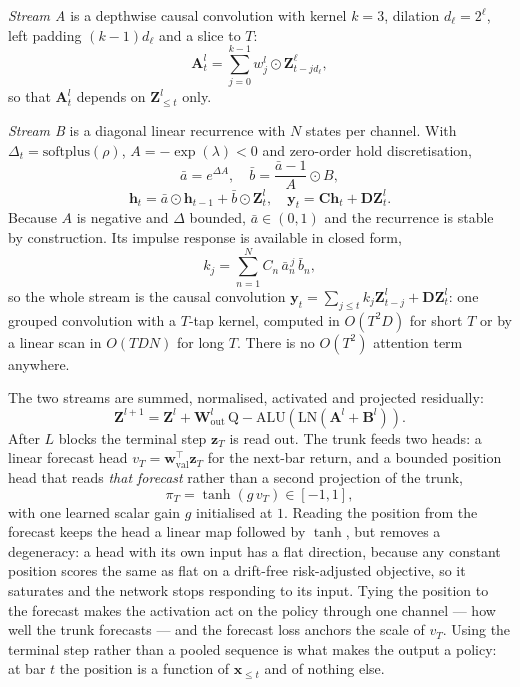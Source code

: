 \documentclass[conference]{IEEEtran}
\newcommand{\QALU}{\mathrm{Q-ALU}}
\begin{document}
\emph{Stream A} is a depthwise causal convolution with kernel $k=3$, dilation
$d_{\ell}=2^{\ell}$, left padding $(k-1)d_{\ell}$ and a slice to $T$:
\begin{equation}
\mathbf{A}^{l}_t=\sum_{j=0}^{k-1} w^{l}_{j}\odot \mathbf{Z}^{\ell}_{t-jd_{\ell}},
\end{equation}
so that $\mathbf{A}^l_t$ depends on $\mathbf{Z}^l_{\le t}$ only.

\emph{Stream B} is a diagonal linear recurrence with $N$ states per channel.
With $\Delta_t=\mathrm{softplus}(\rho)$, $A=-\exp(\lambda)<0$ and zero-order
hold discretisation,
\begin{equation}
\bar{a}=e^{\Delta A},\quad \bar{b}=\frac{\bar a-1}{A}\odot B ,
\end{equation}
\begin{equation}
\mathbf{h}_t=\bar a\odot\mathbf{h}_{t-1}+\bar b\odot\mathbf{Z}^l_t,\quad
\mathbf{y}_t=\mathbf{C}\mathbf{h}_t+\mathbf{D}\mathbf{Z}^l_t .
\end{equation}
Because $A$ is negative and $\Delta$ bounded, $\bar a\in(0,1)$ and the
recurrence is stable by construction. Its impulse response is available in
closed form,
\begin{equation}
k_j=\sum_{n=1}^{N}C_n\,\bar a_n^{\,j}\,\bar b_n ,
\end{equation}
so the whole stream is the causal convolution $\mathbf{y}_t=\sum_{j\le t}k_j
\mathbf{Z}^l_{t-j}+\mathbf{D}\mathbf{Z}^l_t$: one grouped convolution with a
$T$-tap kernel, computed in $O(T^2D)$ for short $T$ or by a linear scan in
$O(TDN)$ for long $T$. There is no $O(T^2)$ attention term anywhere.

The two streams are summed, normalised, activated and projected residually:
\begin{equation}
\mathbf{Z}^{l+1}=\mathbf{Z}^{l}+\mathbf{W}^{l}_{\mathrm{out}}\,
\QALU\!\left(\mathrm{LN}\left(\mathbf{A}^{l}+\mathbf{B}^{l}\right)\right).
\label{eq:block}
\end{equation}
After $L$ blocks the terminal step $\mathbf{z}_T$ is read out. The trunk feeds
two heads: a linear forecast head $v_T=\mathbf{w}_{\mathrm{val}}^{\top}
\mathbf{z}_T$ for the next-bar return, and a bounded position head that reads
\emph{that forecast} rather than a second projection of the trunk,
\begin{equation}
\pi_T=\tanh\!\left(g\,v_T\right)\in[-1,1],
\label{eq:readout}
\end{equation}
with one learned scalar gain $g$ initialised at $1$. Reading the position from
the forecast keeps the head a linear map followed by $\tanh$, but removes a
degeneracy: a head with its own input has a flat direction, because any constant
position scores the same as flat on a drift-free risk-adjusted objective, so it
saturates and the network stops responding to its input. Tying the position to
the forecast makes the activation act on the policy through one channel --- how
well the trunk forecasts --- and the forecast loss anchors the scale of
$v_T$. Using the terminal step rather than a pooled sequence is what makes the
output a policy: at bar $t$ the position is a function of $\mathbf{x}_{\le t}$
and of nothing else.
\end{document}
